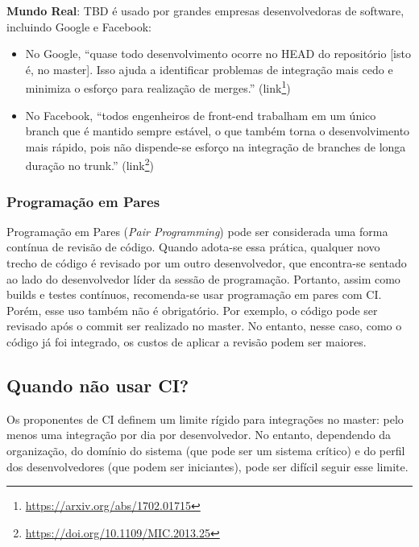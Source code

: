 \documentclass[
  11pt,
  twoside]{book}
\DeclareRobustCommand{\href}[2]{#2\footnote{\url{#1}}}
\newenvironment{esmbox}{\centering \vspace{1.5ex} \begin{tcolorbox}[breakable, colback=backcolor, width=4.9in]}{\end{tcolorbox} \vspace{1.5ex}}
\begin{document}
\begin{esmbox}

\textbf{Mundo Real}: TBD é usado por grandes empresas desenvolvedoras de
software, incluindo Google e Facebook:

\begin{itemize}
\item
  No Google,  ``quase todo desenvolvimento ocorre no HEAD
  do repositório {[}isto é, no master{]}. Isso ajuda a identificar
  problemas de integração mais cedo e minimiza o esforço para realização
  de merges.'' (\href{https://arxiv.org/abs/1702.01715}{link})
\item
  No Facebook,  ``todos engenheiros de front-end
  trabalham em um único branch que é mantido sempre estável, o que
  também torna o desenvolvimento mais rápido, pois não dispende-se
  esforço na integração de branches de longa duração no trunk.''
  (\href{https://doi.org/10.1109/MIC.2013.25}{link})
\end{itemize}

\end{esmbox}

\hypertarget{programauxe7uxe3o-em-pares}{%
\subsubsection*{Programação em Pares}\label{programauxe7uxe3o-em-pares}}

Programação em Pares (\emph{Pair Programming}) pode ser considerada uma
forma contínua de revisão de código. Quando adota-se essa prática,
qualquer novo trecho de código é revisado por um outro desenvolvedor,
que encontra-se sentado ao lado do desenvolvedor líder da sessão de
programação. Portanto, assim como builds e testes contínuos,
recomenda-se usar programação em pares com CI. Porém, esse uso também
não é obrigatório. Por exemplo, o código pode ser revisado após o commit
ser realizado no master. No entanto, nesse caso, como o código já foi
integrado, os custos de aplicar a revisão podem ser maiores.

\hypertarget{quando-nuxe3o-usar-ci}{%
\subsection{Quando não usar CI?}\label{quando-nuxe3o-usar-ci}}


Os proponentes de CI definem um limite rígido para integrações no
master: pelo menos uma integração por dia por desenvolvedor. No entanto,
dependendo da organização, do domínio do sistema (que pode ser um
sistema crítico) e do perfil dos desenvolvedores (que podem ser
iniciantes), pode ser difícil seguir esse limite.
\end{document}
